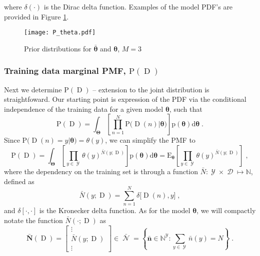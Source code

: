 \documentclass[12pt]{report}
\DeclareMathOperator{\Drm}{\mathrm{D}}
\DeclareMathOperator{\Ycal}{\mathcal{Y}}
\DeclareMathOperator{\Dcal}{\mathcal{D}}
\DeclareMathOperator{\Ncal}{\mathcal{N}}
\begin{document}
where $\delta(\cdot)$ is the Dirac delta function. Examples of the model PDF's are provided in Figure \ref{fig:P_theta}.

\begin{figure}
\centering
\texttt{[image: P\_theta.pdf]}
\caption{Prior distributions for $\bar{\bm{\theta}}$ and $\bm{\theta}$, $M=3$}
\label{fig:P_theta}
\end{figure}


\subsubsection{Training data marginal PMF, $\text{P}(\Drm)$}

Next we determine $\text{P}(\Drm)$ -- extension to the joint distribution is straightfoward. Our starting point is expression of the PDF via the conditional independence of the training data for a given model $\bm{\theta}$, such that
\begin{equation}
\text{P}(\Drm) = \int_{\bm{\Theta}} \left[ \prod_{n=1}^N \text{P}\big( \Drm(n) | \bm{\theta} \big) \right] \text{p}(\bm{\theta}) \mathrm{d}\bm{\theta} \;.
\end{equation}
Since $\text{P}\big( \Drm(n) = y | \bm{\theta} \big) = \theta(y)$, we can simplify the PMF to
\begin{equation} \label{P_D_int2}
\text{P}(\Drm) = \int_{\bm{\Theta}} \left[ \prod_{y \in \Ycal} \theta(y)^{\bar{N}(y;\Drm)} \right] \text{p}(\bm{\theta}) \mathrm{d}\bm{\theta} 
= \text{E}_{\bm{\theta}} \left[ \prod_{y \in \Ycal} \theta(y)^{\bar{N}(y;\Drm)} \right] \;,
\end{equation}
where the dependency on the training set is through a function $\bar{N} : \Ycal \times \Dcal \mapsto \mathbb{N}$, defined as
\begin{equation}
\bar{N}(y;\Drm) = \sum_{n=1}^N \delta\big[ \Drm(n),y \big] \;,
\end{equation}
and $\delta[\cdot,\cdot]$ is the Kronecker delta function. As for the model $\bm{\theta}$, we will compactly notate the function $\bar{N}(\cdot;\Drm)$ as
\begin{equation}
\bar{\bm{N}}(\Drm) = \begin{bmatrix} \vdots \\ \bar{N}(y;\Drm) \\ \vdots \end{bmatrix} \in \bar{\Ncal}
= \left\{ \bar{\bm{n}} \in \mathbb{N}^{\Ycal}: \sum_{y \in \Ycal} \bar{n}(y) = N \right\} \;.
\end{equation}
\end{document}
